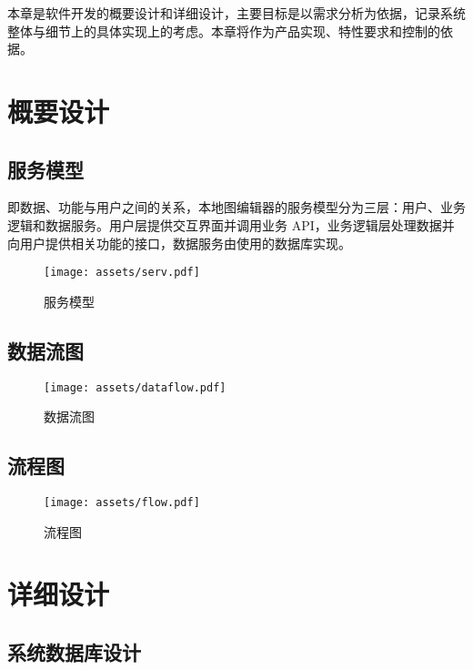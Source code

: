 
本章是软件开发的概要设计和详细设计，主要目标是以需求分析为依据，记录系统整体与细节上的具体实现上的考虑。本章将作为产品实现、特性要求和控制的依据。

\section{概要设计}

\subsection{服务模型}

即数据、功能与用户之间的关系，本地图编辑器的服务模型分为三层：用户、业务逻辑和数据服务。用户层提供交互界面并调用业务 API，业务逻辑层处理数据并向用户提供相关功能的接口，数据服务由使用的数据库实现。

\begin{figure}[H]
  \centering
  \texttt{[image: assets/serv.pdf]}
  \caption{服务模型}
  \label{fig:serv}
\end{figure}

\subsection{数据流图}

\begin{figure}[H]
  \centering
  \texttt{[image: assets/dataflow.pdf]}
  \caption{数据流图}
  \label{fig:dataflow}
\end{figure}

\subsection{流程图}

\begin{figure}[H]
  \centering
  \texttt{[image: assets/flow.pdf]}
  \caption{流程图}
  \label{fig:flow}
\end{figure}

\section{详细设计}

\subsection{系统数据库设计}

